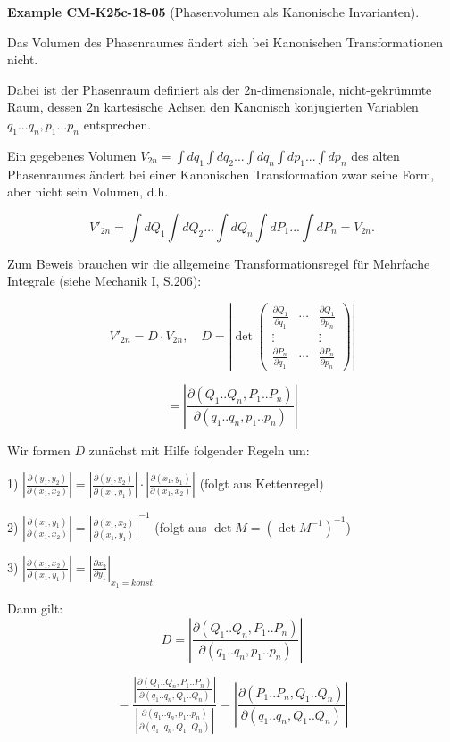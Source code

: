 \documentclass[10pt, letterpaper]{article}
\newcommand{\CustomHeading}[3]{%
  \par\medskip\noindent%
  \textbf{#1 #2} \textnormal{(#3)}.\enskip%
}
\newenvironment{EXA}[2]{\CustomHeading{Example}{#1}{#2}}{}
\begin{document}
\begin{EXA}{CM-K25c-18-05}{Phasenvolumen als Kanonische Invarianten}
Das Volumen des Phasenraumes ändert sich bei Kanonischen Transformationen nicht.


Dabei ist der Phasenraum definiert als der 2n-dimensionale, nicht-gekrümmte Raum, dessen 2n kartesische Achsen den Kanonisch konjugierten Variablen $q_1...q_n, p_1...p_n$ entsprechen.

Ein gegebenes Volumen $V_{2n} = \int dq_1 \int dq_2 ... \int dq_n \int dp_1 ... \int dp_n$ 
des alten Phasenraumes ändert bei einer Kanonischen Transformation 
zwar seine Form, aber nicht sein Volumen, d.h.

\[
V'_{2n} = \int dQ_1 \int dQ_2 ... \int dQ_n \int dP_1 ... \int dP_n = V_{2n}.
\]

Zum Beweis brauchen wir die allgemeine Transformationsregel 
für Mehrfache Integrale (siehe Mechanik I, S.206):

\[
V'_{2n} = D \cdot V_{2n}, \quad D = \left|\det\begin{pmatrix}
\frac{\partial Q_1}{\partial q_1} & \cdots & \frac{\partial Q_1}{\partial p_n} \\
\vdots & & \vdots \\
\frac{\partial P_n}{\partial q_1} & \cdots & \frac{\partial P_n}{\partial p_n}
\end{pmatrix}\right|
\]

\[
= \left|\frac{\partial(Q_1 .. Q_n, P_1 .. P_n)}{\partial(q_1 .. q_n, p_1 .. p_n)}\right|
\]

Wir formen $D$ zunächst mit Hilfe folgender Regeln um:

1) $\left|\frac{\partial(y_1,y_2)}{\partial(x_1,x_2)}\right| = \left|\frac{\partial(y_1,y_2)}{\partial(x_1,y_1)}\right| \cdot \left|\frac{\partial(x_1,y_1)}{\partial(x_1,x_2)}\right|$ (folgt aus Kettenregel)

2) $\left|\frac{\partial(x_1,y_1)}{\partial(x_1,x_2)}\right| = \left|\frac{\partial(x_1,x_2)}{\partial(x_1,y_1)}\right|^{-1}$ (folgt aus $\det M = (\det M^{-1})^{-1}$)

3) $\left|\frac{\partial(x_1,x_2)}{\partial(x_1,y_1)}\right| = \left|\frac{\partial x_2}{\partial y_1}\right|_{x_1=konst.}$

Dann gilt:
\[
D = \left|\frac{\partial(Q_1..Q_n,P_1..P_n)}{\partial(q_1..q_n,p_1..p_n)}\right|
\]

\[
= \frac{\left|\frac{\partial(Q_1..Q_n,P_1..P_n)}{\partial(q_1..q_n,Q_1..Q_n)}\right|}{\left|\frac{\partial(q_1..q_n,p_1..p_n)}{\partial(q_1..q_n,Q_1..Q_n)}\right|} = 
\left|\frac{\partial(P_1..P_n,Q_1..Q_n)}{\partial(q_1..q_n,Q_1..Q_n)}\right|
\]


\end{EXA}
\end{document}
